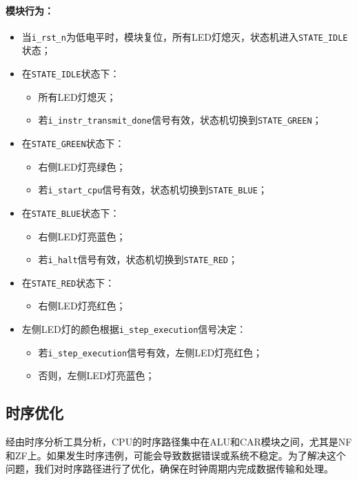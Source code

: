 \documentclass[lang=cn,a4paper,newtx]{elegantpaper}
\begin{document}
\paragraph{模块行为：}
\begin{itemize}
  \item 当\texttt{i\_rst\_n}为低电平时，模块复位，所有LED灯熄灭，状态机进入\texttt{STATE\_IDLE}状态；
  \item 在\texttt{STATE\_IDLE}状态下：
    \begin{itemize}
      \item 所有LED灯熄灭；
      \item 若\texttt{i\_instr\_transmit\_done}信号有效，状态机切换到\texttt{STATE\_GREEN}；
    \end{itemize}
  \item 在\texttt{STATE\_GREEN}状态下：
    \begin{itemize}
      \item 右侧LED灯亮绿色；
      \item 若\texttt{i\_start\_cpu}信号有效，状态机切换到\texttt{STATE\_BLUE}；
    \end{itemize}
  \item 在\texttt{STATE\_BLUE}状态下：
    \begin{itemize}
      \item 右侧LED灯亮蓝色；
      \item 若\texttt{i\_halt}信号有效，状态机切换到\texttt{STATE\_RED}；
    \end{itemize}
  \item 在\texttt{STATE\_RED}状态下：
    \begin{itemize}
      \item 右侧LED灯亮红色；
    \end{itemize}
  \item 左侧LED灯的颜色根据\texttt{i\_step\_execution}信号决定：
    \begin{itemize}
      \item 若\texttt{i\_step\_execution}信号有效，左侧LED灯亮红色；
      \item 否则，左侧LED灯亮蓝色；
    \end{itemize}
\end{itemize}
\subsection{时序优化}
经由时序分析工具分析，CPU的时序路径集中在ALU和CAR模块之间，尤其是NF和ZF上。如果发生时序违例，可能会导致数据错误或系统不稳定。为了解决这个问题，我们对时序路径进行了优化，确保在时钟周期内完成数据传输和处理。
\end{document}
